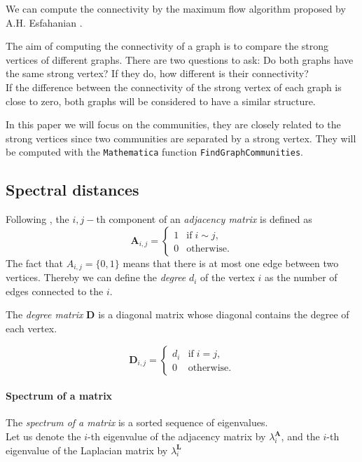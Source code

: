 \documentclass[english, 12pt]{article}
\begin{document}
We can compute the connectivity by the maximum flow algorithm proposed by A.H. Esfahanian \cite[Algorithm 11]{2013Esfahanian}.


The aim of computing the connectivity of a graph is to compare the strong vertices of different graphs. There are two questions to ask:
Do both graphs have the same strong vertex? If they do, how different is their connectivity?\\
If the difference between the connectivity of the strong vertex of each graph is close to zero, both graphs will be considered to have a similar structure.

In this paper we will focus on the communities, they are closely related to the strong vertices since two communities are separated by a strong vertex. They will be computed with the \texttt{Mathematica} function \texttt{FindGraphCommunities}.

\subsection{Spectral distances}

Following \cite{2020Wills}, the $i,j-$th component of an {\it adjacency matrix} is defined as
$$\mathbf A_{i,j} = \begin{cases}1&\text{if}\; i\sim j,\\0&\text{otherwise.}\end{cases}$$
The fact that $A_{i,j} = \{0,1\}$ means that there is at most one edge between two vertices. Thereby we can define the {\it degree} $d_i$ of the vertex $i$ as the number of edges connected to the $i$.

The {\it degree matrix} $\mathbf D$ is a diagonal matrix whose diagonal contains the degree of each vertex.

$$\mathbf D_{i,j} =  \begin{cases}d_i&\text{if}\; i = j,\\0&\text{otherwise.}\end{cases}$$

\paragraph{Spectrum of a matrix}

The {\it spectrum of a matrix} is a sorted sequence of eigenvalues.\\
Let us denote the $i$-th eigenvalue of the adjacency matrix by $\lambda_i^{\mathbf A}$, and the $i$-th eigenvalue of the Laplacian matrix by $\lambda_i^{\mathbf L}$
\end{document}
